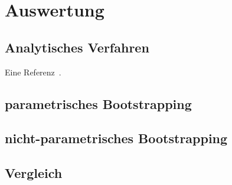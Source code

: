 \chapter{Auswertung}
\label{chapter:kap5}

\section{Analytisches Verfahren}
Eine Referenz~\cite{AggarwalV88}.

\section{parametrisches Bootstrapping}

\section{nicht-parametrisches Bootstrapping}

\section{Vergleich}
